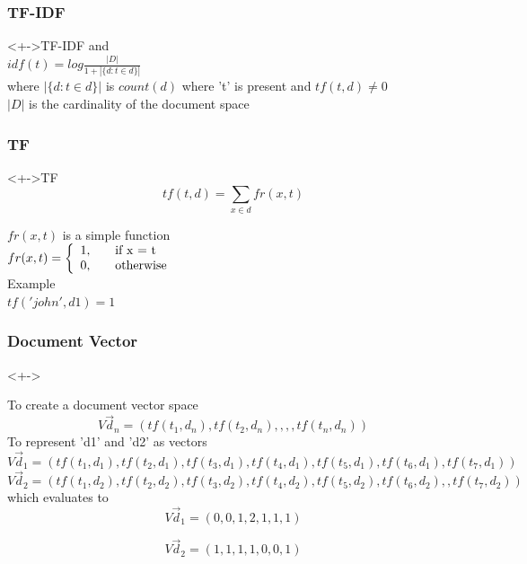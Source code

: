 \documentclass[serif,11pt,aspectratio=1610,table]{beamer}
\begin{document}
\begin{frame}[fragile]
 \frametitle{TF-IDF}
 \begin{block}<+->{TF-IDF}
 and \\
  $idf(t) = log \frac{|D|}{1+|\{d : t \in d\}|}$ \\
 where $  | \{d : t \in d\} | $ is    $count(d)$ where 't' is present and $tf(t,d) \ne 0$ \\
 $|D|$ is the cardinality of the document space
 \end{block}

\end{frame}



\begin{frame}[fragile]
 \frametitle{TF}
 \begin{block}<+->{TF}
   \begin{displaymath}
    tf(t,d) = \sum_ { x \in d} fr(x,t)  
   \end{displaymath}

  $fr(x,t)$ is a simple function\\
  $fr(x,t) = \left\{
  \begin{array}{l l} 
   1, & \quad \text{if x = t} \\
   0, & \quad \text{otherwise} \\
  \end{array} \right. $ \\
  Example \\
  $tf('john',d1) = 1 $
 \end{block}

\end{frame}


\begin{frame}[fragile]
 \frametitle{Document Vector}
 \begin{block}<+->{}

To create a document vector space \\
\begin{displaymath}
 V\vec{d}_{n} = (tf({t}_1,{d}_n),tf({t}_2,{d}_n),,,,tf({t}_n,{d}_n))
\end{displaymath}
To represent 'd1' and 'd2' as vectors 
\footnotesize
\begin{displaymath}
 V\vec{d}_{1} = (tf({t}_1,{d}_1),tf({t}_2,{d}_1),tf({t}_3,{d}_1),tf({t}_4,{d}_1),tf({t}_5,{d}_1),tf({t}_6,{d}_1),tf({t}_7,{d}_1))
 \end{displaymath}
 \footnotesize
\begin{displaymath}
 V\vec{d}_{2} = (tf({t}_1,{d}_2),tf({t}_2,{d}_2),tf({t}_3,{d}_2),tf({t}_4,{d}_2),tf({t}_5,{d}_2),tf({t}_6,{d}_2),,tf({t}_7,{d}_2))
\end{displaymath}
which evaluates to 
\begin{displaymath}
 V\vec{d}_{1} = (0, 0, 1, 2, 1, 1, 1)
\end{displaymath}

\begin{displaymath}
 V\vec{d}_{2} = (1, 1, 1, 1, 0, 0, 1)
\end{displaymath}

 \end{block}

\end{frame}
\end{document}

